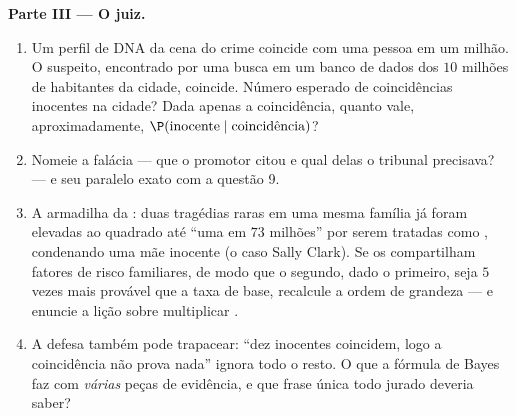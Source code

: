 \begin{problem}
\medskip
\noindent\textbf{Parte III --- O juiz.}
\begin{enumerate}[resume]
  \item Um perfil de DNA da cena do crime coincide com uma
        pessoa em um milhão. O suspeito, encontrado por uma
        busca em um banco de dados dos $10$ milhões de
        habitantes da cidade, coincide. Número esperado de
        coincidências inocentes na cidade? Dada apenas a
        coincidência, quanto vale, aproximadamente,
        $\P(\text{inocente} \mid \text{coincidência})$?
  \item Nomeie a falácia --- que  o promotor citou
        e qual delas o tribunal precisava? --- e seu paralelo
        exato com a questão 9.
  \item A armadilha da : duas tragédias raras em
        uma mesma família já foram elevadas ao quadrado até
        ``uma em $73$ milhões'' por serem tratadas como
        , condenando uma mãe inocente (o caso
        Sally Clark). Se os  compartilham fatores de
        risco familiares, de modo que o segundo, dado o
        primeiro, seja $5$ vezes mais provável que a taxa de
        base, recalcule a ordem de grandeza --- e enuncie a
        lição sobre multiplicar .
  \item A defesa também pode trapacear: ``dez inocentes
        coincidem, logo a coincidência não prova nada'' ignora
        todo o resto. O que a fórmula de Bayes faz com
        \emph{várias} peças de evidência, e que frase única
        todo jurado deveria saber?
\end{enumerate}


\end{problem}
